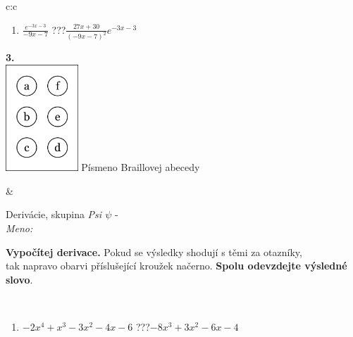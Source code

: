 \documentclass[10pt]{report}
\begin{document}
\begin{tabular}{c:c}
\begin{minipage}[c][104.5mm][t]{0.5\linewidth}
\begin{center}
\begin{minipage}{0.79\linewidth}
\begin{center}
\begin{varwidth}{\linewidth}
\begin{enumerate}
\item $\frac{e^{-3x-3}}{-9x-7}$\quad \dotfill\; ???\;\dotfill \quad $\frac{27x+30}{(-9x-7)^2}e^{-3x-3}$
\end{enumerate}
\end{varwidth}
\end{center}
\end{minipage}
\begin{minipage}{0.20\linewidth}
\begin{center}
{\Huge\bfseries 3.} \\[2mm]
\includegraphics[height=40mm]{../images/braille.png}
{\small Písmeno Braillovej abecedy}
\end{center}
\end{minipage}
\end{center}
\end{minipage}
&
\begin{minipage}[c][104.5mm][t]{0.5\linewidth}
\begin{center}
\vspace{7mm}
{\huge Derivácie, skupina \textit{Psi $\psi$} -}\\[5mm]
\textit{Meno:}\phantom{xxxxxxxxxxxxxxxxxxxxxxxxxxxxxxxxxxxxxxxxxxxxxxxxxxxxxxxxxxxxxxxxx}\\[5mm]
\begin{minipage}{0.95\linewidth}
\begin{center}
\textbf{Vypočítej derivace.} Pokud se výsledky shodují s těmi za otazníky,\\tak napravo obarvi příslušející kroužek načerno. \textbf{Spolu odevzdejte výsledné slovo}.
\end{center}
\end{minipage}
\\[1mm]
\begin{minipage}{0.79\linewidth}
\begin{center}
\begin{varwidth}{\linewidth}
\begin{enumerate}
\normalsize
\item $-2x^4+x^3-3x^2-4x-6$\quad \dotfill\; ???\;\dotfill \quad $-8x^3+3x^2-6x-4$

\end{enumerate}
\end{varwidth}
\end{center}
\end{minipage}
\end{center}
\end{minipage}
\end{tabular}
\end{document}
